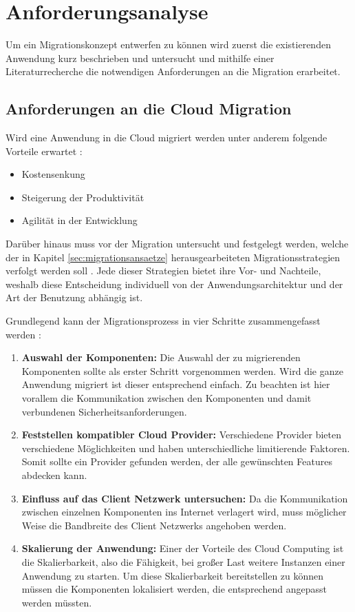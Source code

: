 \section{Anforderungsanalyse}


Um ein Migrationskonzept entwerfen zu können wird zuerst die existierenden Anwendung kurz beschrieben und untersucht und mithilfe einer Literaturrecherche die notwendigen Anforderungen an die Migration erarbeitet.

\subsection{Anforderungen an die Cloud Migration}
Wird eine Anwendung in die Cloud migriert werden unter anderem folgende Vorteile erwartet \cite[Vgl. auch im Folgenden][03:23-05:36min]{AWS2019}:
\begin{itemize}
\item Kostensenkung
\item Steigerung der Produktivität
\item Agilität in der Entwicklung
\end{itemize}

Darüber hinaus muss vor der Migration untersucht und festgelegt werden, welche der in Kapitel \ref{sec:migrationsansaetze} herausgearbeiteten Migrationsstrategien verfolgt werden soll \cite[Vgl.][10:38-13:23min]{AWS2019}. Jede dieser Strategien bietet ihre Vor- und Nachteile, weshalb diese Entscheidung individuell von der Anwendungsarchitektur und der Art der Benutzung abhängig ist. \pagebreak

Grundlegend kann der Migrationsprozess  in vier Schritte zusammengefasst werden \cite[Vgl. auch im Folgenden][S. 34f]{Maenhaut2016}:
\begin{enumerate}
\item \textbf{Auswahl der Komponenten:} Die Auswahl der zu migrierenden Komponenten sollte als erster Schritt vorgenommen werden. Wird die ganze Anwendung migriert ist dieser entsprechend einfach. Zu beachten ist hier vorallem die Kommunikation zwischen den Komponenten und damit verbundenen Sicherheitsanforderungen.
\item \textbf{Feststellen kompatibler Cloud Provider:} Verschiedene Provider bieten verschiedene Möglichkeiten und haben unterschiedliche limitierende Faktoren. Somit sollte ein Provider gefunden werden, der alle gewünschten Features abdecken kann.
\item \textbf{Einfluss auf das Client Netzwerk untersuchen:} Da die Kommunikation zwischen einzelnen Komponenten ins Internet verlagert wird, muss möglicher Weise die Bandbreite des Client Netzwerks angehoben werden.
\item \textbf{Skalierung der Anwendung:} Einer der Vorteile des Cloud Computing ist die Skalierbarkeit, also die Fähigkeit, bei großer Last weitere Instanzen einer Anwendung zu starten. Um diese Skalierbarkeit bereitstellen zu können müssen die Komponenten lokalisiert werden, die entsprechend angepasst werden müssten.
\end{enumerate}


